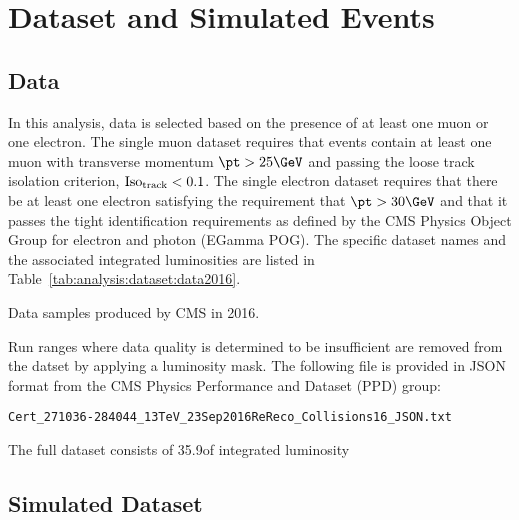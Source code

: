 \section{Dataset and Simulated Events}
\label{sec:analysis:dataset}


\subsection{Data}
\label{sec:analysis:dataset:data}

In this analysis, data is selected based on the presence of at least one muon or one electron. The single muon dataset requires that events contain at least one muon with transverse momentum $\pt > 25\GeV$ and passing the loose track isolation criterion, $\rm Iso_{track} < 0.1$. The single electron dataset requires that there be at least one electron satisfying the requirement that $\pt > 30\GeV$ and that it passes the tight identification requirements as defined by the CMS Physics Object Group for electron and photon (EGamma POG).  The specific dataset names and the associated integrated luminosities are listed in Table~\ref{tab:analysis:dataset:data2016}.

\begin{table}[ht]
    \centering
    \setlength{\tabcolsep}{1em}
    \renewcommand{\arraystretch}{1.1}
    \caption{Data samples produced by CMS in 2016.} \label{tab:analysis:dataset:data2016}
    
\end{table}



\noindent Run ranges where data quality is determined to be insufficient are removed from the datset by applying a luminosity mask. The following file is provided in JSON format from the CMS Physics Performance and Dataset (PPD) group:

\texttt{Cert\_271036-284044\_13TeV\_23Sep2016ReReco\_Collisions16\_JSON.txt}

\noindent The full dataset consists of 35.9\fbinv of integrated luminosity~\cite{cms:lumi2016:CMS-PAS-LUM-17-001}




\subsection{Simulated Dataset}
\label{sec:analysis:dataset:simulation}

